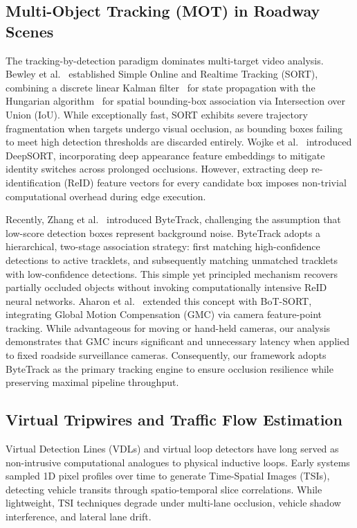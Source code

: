 \subsection{Multi-Object Tracking (MOT) in Roadway Scenes}
The tracking-by-detection paradigm dominates multi-target video analysis. Bewley et al.~\cite{bewley2016sort} established Simple Online and Realtime Tracking (SORT), combining a discrete linear Kalman filter~\cite{kalman1960new} for state propagation with the Hungarian algorithm~\cite{kuhn1955hungarian} for spatial bounding-box association via Intersection over Union (IoU). While exceptionally fast, SORT exhibits severe trajectory fragmentation when targets undergo visual occlusion, as bounding boxes failing to meet high detection thresholds are discarded entirely. Wojke et al.~\cite{wojke2017deepsort} introduced DeepSORT, incorporating deep appearance feature embeddings to mitigate identity switches across prolonged occlusions. However, extracting deep re-identification (ReID) feature vectors for every candidate box imposes non-trivial computational overhead during edge execution.

Recently, Zhang et al.~\cite{zhang2022bytetrack} introduced ByteTrack, challenging the assumption that low-score detection boxes represent background noise. ByteTrack adopts a hierarchical, two-stage association strategy: first matching high-confidence detections to active tracklets, and subsequently matching unmatched tracklets with low-confidence detections. This simple yet principled mechanism recovers partially occluded objects without invoking computationally intensive ReID neural networks. Aharon et al.~\cite{aharon2022botsort} extended this concept with BoT-SORT, integrating Global Motion Compensation (GMC) via camera feature-point tracking. While advantageous for moving or hand-held cameras, our analysis demonstrates that GMC incurs significant and unnecessary latency when applied to fixed roadside surveillance cameras. Consequently, our framework adopts ByteTrack as the primary tracking engine to ensure occlusion resilience while preserving maximal pipeline throughput.

\subsection{Virtual Tripwires and Traffic Flow Estimation}
Virtual Detection Lines (VDLs) and virtual loop detectors have long served as non-intrusive computational analogues to physical inductive loops. Early systems sampled 1D pixel profiles over time to generate Time-Spatial Images (TSIs), detecting vehicle transits through spatio-temporal slice correlations. While lightweight, TSI techniques degrade under multi-lane occlusion, vehicle shadow interference, and lateral lane drift.

